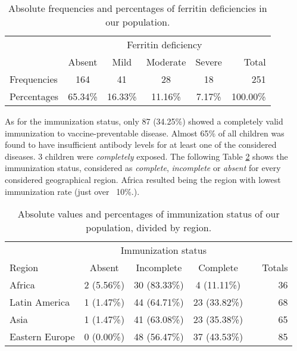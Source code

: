 \begin{table}[H]
   \centering
   \begin{tabular}{l c c c c | r}
   	  & & \multicolumn{3}{c}{Ferritin deficiency} & \\
   	 \cline{3-5}
       & Absent & Mild & Moderate & Severe & Total\\
      \hline
      Frequencies & 164 & 41 & 28 & 18 & 251\\
      Percentages & 65.34\% & 16.33\% & 11.16\% & 7.17\% & 100.00\%\\
   \end{tabular}
   \caption{Absolute frequencies and percentages of ferritin deficiencies in our population.}
    \label{tab:ferritinpatfreq}
\end{table}

As for the immunization status, only 87 (34.25\%) showed a completely valid immunization to vaccine-preventable disease. Almost 65\% of all children was found to have insufficient antibody levels for at least one of the considered diseases. 3 children were \textit{completely} exposed. The following Table \ref{tab:immunizationperregion} shows the immunization status, considered as \textit{complete}, \textit{incomplete} or \textit{absent} for every considered geographical region. Africa resulted being the region with lowest immunization rate (just over ~10\%.).

\begin{table}[H]
   \centering
   \begin{tabular}{l c c c c | r}
   	  & \multicolumn{3}{c}{Immunization status} & \\
   	 \cline{2-4}
      Region\footnotemark[1] & Absent & Incomplete & Complete & & Totals\\
      \hline
      Africa & 2 (5.56\%) & 30 (83.33\%) & 4 (11.11\%) & & 36\\
      Latin America & 1 (1.47\%) & 44 (64.71\%) & 23 (33.82\%) & & 68\\
      Asia & 1 (1.47\%) & 41 (63.08\%) & 23 (35.38\%) & & 65\\
      Eastern Europe & 0 (0.00\%) & 48 (56.47\%) & 37 (43.53\%) & & 85\\
   \end{tabular}
   \caption{Absolute values and percentages of immunization status of our population, divided by region.}
    \label{tab:immunizationperregion}
\end{table}

